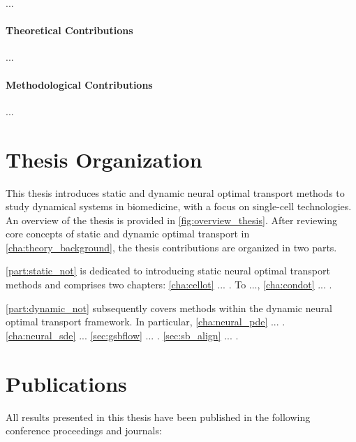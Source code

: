 ...

\paragraph{Theoretical Contributions}
...

\paragraph{Methodological Contributions}
...




\section{Thesis Organization}

This thesis introduces static and dynamic neural optimal transport methods to study dynamical systems in biomedicine, with a focus on single-cell technologies. An overview of the thesis is provided in \cref{fig:overview_thesis}.
After reviewing core concepts of static and dynamic optimal transport in \cref{cha:theory_background}, the thesis contributions are organized in two parts. 

\cref{part:static_not} is dedicated to introducing static neural optimal transport methods and comprises two chapters:
\cref{cha:cellot} ... \citep{bunne2021learning}. To ..., \cref{cha:condot} ... \citep{bunne2022supervised}.

\cref{part:dynamic_not} subsequently covers methods within the dynamic neural optimal transport framework. In particular, \cref{cha:neural_pde} ... \citep{bunne2022proximal}.
\cref{cha:neural_sde} ...
\cref{sec:gsbflow} ... \citep{bunne2022recovering}.
\cref{sec:sb_align} ... \citep{somnath2023aligned}.


\section{Publications}
All results presented in this thesis have been published in the following conference proceedings and journals:


